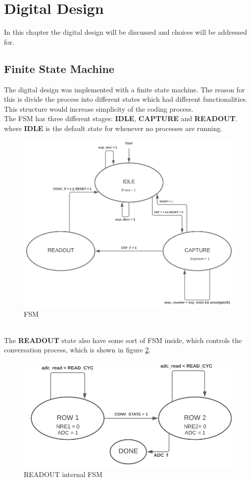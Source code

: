 \section{Digital Design}
In this chapter the digital design will be discussed and choices will be addressed for. \\
\subsection{Finite State Machine}

The digital design was implemented with a finite state machine. The reason for this is divide the process into different states which had different functionalities. This structure would increase simplicity of the coding process. \\

The FSM has three different stages: \textbf{IDLE}, \textbf{CAPTURE} and \textbf{READOUT}. where \textbf{IDLE} is the default state for whenever no processes are running.
\begin{figure}[htp]
    \centering
    \includegraphics[scale=0.6]{Images/IC_FSM.PNG}
    \caption{FSM}
    \label{fig:FSM}
\end{figure} \\
The \textbf{READOUT} state also have some sort of FSM inside, which controls the conversation process, which is shown in figure \ref{fig:READOUT internal FSM}.
\begin{figure}[htp]
    \centering
    \includegraphics[scale=0.5]{Images/IC_FSM_conv.PNG}
    \caption{READOUT internal FSM}
    \label{fig:READOUT internal FSM}
\end{figure} \\
